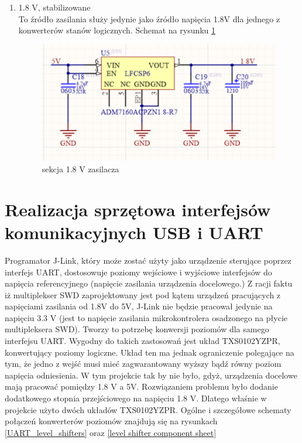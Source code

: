 \begin{enumerate}
    \item 1.8 V, stabilizowane\\
    To źródło zasilania służy jedynie jako źródło napięcia 1.8V dla jednego z konwerterów stanów logicznych.  
    Schemat na rysunku \ref{1.8V_power_supply}
    
    \begin{figure}[H]
    \centering
    \includegraphics[width=0.45\paperwidth]{images/1,8V_supply.png}
    \caption{sekcja 1.8 V zasilacza}
    \label{1.8V_power_supply}
    \end{figure}
    
\end{enumerate}

\section{Realizacja sprzętowa interfejsów komunikacyjnych USB i UART}

Programator J-Link, który może zostać użyty jako urządzenie sterujące poprzez interfejs UART, dostosowuje poziomy wejściowe i wyjściowe interfejsów do napięcia referencyjnego (napięcie zasilania urządzenia docelowego.) Z racji faktu iż multiplekser SWD zaprojektowany jest pod kątem urządzeń pracujących z napięciami zasilania od 1.8V do 5V, J-Link nie będzie pracował jedynie na napięciu 3.3 V (jest to napięcie zasilania mikrokontrolera osadzonego na płycie multipleksera SWD). Tworzy to potrzebę konwersji poziomów dla samego interfejsu UART. Wygodny do takich zastosowań jest układ TXS0102YZPR, konwertujący poziomy logiczne. Układ ten ma jednak ograniczenie polegające na tym, że jedno z wejść musi mieć zagwarantowany wyższy bądź równy poziom napięcia odniesienia. W tym projekcie tak by nie było, gdyż, urządzenia docelowe mają pracować pomiędzy 1.8 V a 5V. Rozwiązaniem problemu było dodanie dodatkowego stopnia przejściowego na napięciu 1.8 V. Dlatego właśnie w projekcie użyto dwóch układów TXS0102YZPR.
Ogólne i szczegółowe schematy połączeń konwerterów poziomów znajdują się na rysunkach \ref{UART_level_shifters} oraz \ref{level shifter component sheet}

